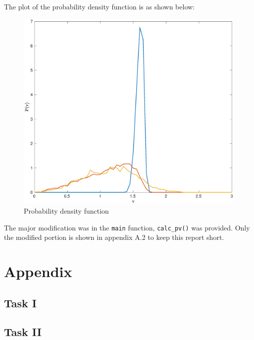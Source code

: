 \documentclass[11pt, oneside]{article}   	%
\begin{document}
 The plot of the probability density function is as shown below:
 \begin{figure}[!htbp]
 	\centering
 	\includegraphics[scale=0.22]{probDensFunc.eps}
 	\caption{Probability density function}
 \end{figure}
The major modification was in the \texttt{main} function, \texttt{calc\_pv()} was provided. Only the modified portion is shown in appendix A.2 to keep this report short.

\appendix
\section{Appendix}
\subsection{Task I}


\subsection{Task II}

\end{document}
